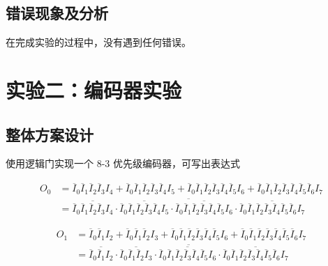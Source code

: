 \documentclass[12pt, a4paper]{ctexart}
\begin{document}
\subsection{错误现象及分析}

在完成实验的过程中，没有遇到任何错误。

\section{实验二：编码器实验}

\subsection{整体方案设计}

使用逻辑门实现一个 8-3 优先级编码器，可写出表达式

\begin{equation}
    \begin{aligned}
        O_0&=\overline I_0\overline I_1\overline I_2\overline I_3I_4
            +\overline I_0\overline I_1\overline I_2\overline I_3\overline I_4I_5
            +\overline I_0\overline I_1\overline I_2\overline I_3\overline I_4\overline I_5I_6
            +\overline I_0\overline I_1\overline I_2\overline I_3\overline I_4\overline I_5\overline I_6I_7
        \\ &=\overline{
            \overline{\overline I_0\overline I_1\overline I_2\overline I_3I_4}\cdot
            \overline{\overline I_0\overline I_1\overline I_2\overline I_3\overline I_4I_5}\cdot
            \overline{\overline I_0\overline I_1\overline I_2\overline I_3\overline I_4\overline I_5I_6}\cdot
            \overline{\overline I_0\overline I_1\overline I_2\overline I_3\overline I_4\overline I_5\overline I_6I_7}
        }
    \end{aligned}
\end{equation}

\begin{equation}
    \begin{aligned}
        O_1&=\overline I_0\overline I_1I_2
            +\overline I_0\overline I_1\overline I_2I_3
            +\overline I_0\overline I_1\overline I_2\overline I_3\overline I_4\overline I_5I_6
            +\overline I_0\overline I_1\overline I_2\overline I_3\overline I_4\overline I_5\overline I_6I_7
        \\ &=\overline{
            \overline{\overline I_0\overline I_1I_2}\cdot
            \overline{\overline I_0\overline I_1\overline I_2I_3}\cdot
            \overline{\overline I_0\overline I_1\overline I_2\overline I_3\overline I_4\overline I_5I_6}\cdot
            \overline{\overline I_0\overline I_1\overline I_2\overline I_3\overline I_4\overline I_5\overline I_6I_7}
        }
    \end{aligned}
\end{equation}
\end{document}
